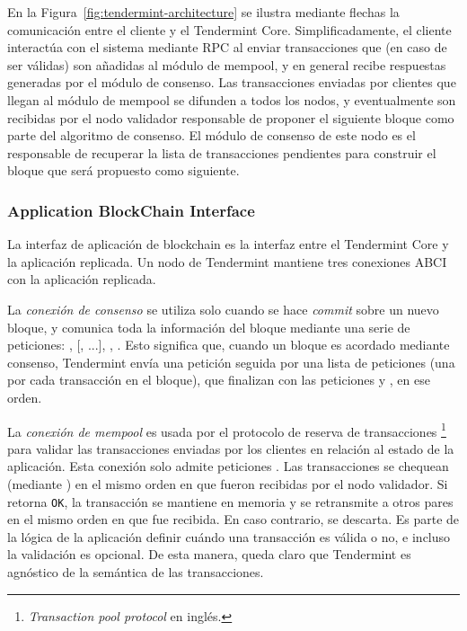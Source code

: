 En la Figura~\ref{fig:tendermint-architecture} se ilustra mediante flechas la comunicación
entre el cliente y el Tendermint Core.
Simplificadamente, el cliente interactúa con el sistema mediante RPC al enviar transacciones
que (en caso de ser válidas) son añadidas al módulo de mempool,
y en general recibe respuestas generadas por el módulo de consenso.
Las transacciones enviadas por clientes que llegan al módulo de mempool se difunden a todos los nodos, y eventualmente son recibidas
por el nodo validador responsable de proponer el siguiente bloque como parte del algoritmo de consenso.
El módulo de consenso de este nodo es el responsable de recuperar la lista de transacciones pendientes
para construir el bloque que será propuesto como siguiente. 


\subsubsection{Application BlockChain Interface}\label{subsec:abci}
La interfaz de aplicación de blockchain es la interfaz entre el Tendermint Core y la aplicación replicada.
%
Un nodo de Tendermint mantiene tres conexiones ABCI con la aplicación replicada.
%

La \textit{conexión de consenso} se utiliza solo cuando se hace \textit{commit} sobre un nuevo bloque,
y comunica toda la información del bloque mediante una serie de peticiones: 
\BeginBlock, [\DeliverTx, ...], \EndBlock, \Commit.
%
Esto significa que, cuando un bloque es acordado mediante consenso, Tendermint envía una petición \BeginBlock
seguida por una lista de peticiones \DeliverTx (una por cada transacción en el bloque), que finalizan con las
peticiones \EndBlock y \Commit, en ese orden.

%

La \textit{conexión de mempool} es usada por el protocolo de reserva de transacciones \footnote{\textit{Transaction pool protocol}
en inglés.} para validar las transacciones enviadas por los clientes en relación al estado de la aplicación.
%
Esta conexión solo admite peticiones \CheckTx. Las transacciones se chequean (mediante \CheckTx) en el mismo orden
en que fueron recibidas por el nodo validador.
%
Si \CheckTx retorna \texttt{OK}, la transacción se mantiene en memoria y se retransmite a otros pares en el mismo orden
en que fue recibida.
%
En caso contrario, se descarta.
%
Es parte de la lógica de la aplicación definir cuándo una transacción es válida o no, e incluso la validación es opcional.
%
De esta manera, queda claro que Tendermint es agnóstico de la semántica de las transacciones.

